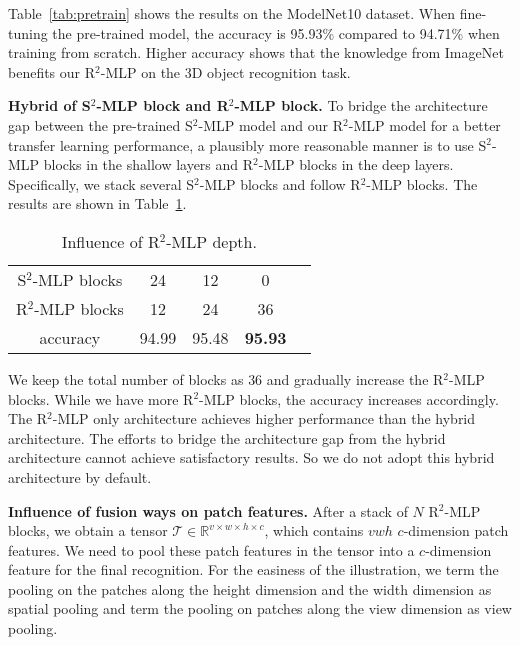 \documentclass[11pt]{article}
\begin{document}
Table~\ref{tab:pretrain} shows the results on the ModelNet10 dataset.  When fine-tuning the pre-trained model, the accuracy is 95.93\% compared to 94.71\% when training from scratch. Higher accuracy shows that the knowledge from ImageNet benefits our R$^2$-MLP on the 3D object recognition task.





\vspace{0.2in}\noindent\textbf{Hybrid of S\texorpdfstring{$^2$}{\texttwosuperior}-MLP block and R\texorpdfstring{$^2$}{\texttwosuperior}-MLP block.}
To bridge the architecture gap between the pre-trained S$^2$-MLP model and our R$^2$-MLP model for a better transfer learning performance, a plausibly more reasonable manner is to use  S$^2$-MLP blocks in the shallow layers and R$^2$-MLP blocks in the deep layers. Specifically, we stack several S$^2$-MLP blocks and follow R$^2$-MLP blocks. The results are shown in Table~\ref{tab:hybrid}.

\begin{table}[ht]
\caption{Influence of R$^2$-MLP depth.}\label{tab:hybrid}
\centering
\begin{tabular}{ccccc}
\toprule
S$^2$-MLP blocks & 24 & 12 & 0 \\
R$^2$-MLP blocks & 12 & 24 & 36 \\
\midrule
accuracy & 94.99 & 95.48 & \textbf{95.93} \\
\bottomrule
\end{tabular}
\end{table}


We keep the total number of blocks as $36$ and gradually increase the R$^2$-MLP blocks. While we have more R$^2$-MLP blocks, the accuracy increases accordingly. The R$^2$-MLP only architecture achieves higher performance than the hybrid architecture. The efforts to bridge the architecture gap from the hybrid architecture cannot achieve satisfactory results. So we do not adopt this hybrid architecture by default.







\vspace{0.2in}\noindent\textbf{Influence of fusion ways on patch features.}
After a stack of $N$ R$^2$-MLP blocks, we obtain a tensor $\bm{\mathcal{T}} \in \mathbb{R}^{v\times w \times h \times c}$, which contains $vwh$ $c$-dimension patch features. We need to pool these patch features in the tensor into a $c$-dimension feature for the final recognition. For the easiness of the illustration, we term the pooling on the patches along the height dimension and the width dimension as spatial pooling and term the pooling on patches along the view dimension as view pooling.
\end{document}
